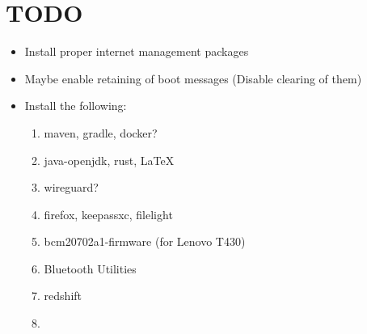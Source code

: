 
\section{TODO}
\begin{itemize}
    \item Install proper internet management packages
    \item Maybe enable retaining of boot messages (Disable clearing of them)
    \item Install the following:
    \begin{enumerate}
        \item maven, gradle, docker?
        \item java-openjdk, rust, \LaTeX
        \item wireguard?
        \item firefox, keepassxc, filelight
        \item bcm20702a1-firmware (for Lenovo T430)
        \item Bluetooth Utilities
        \item redshift
        \item 
    \end{enumerate}
\end{itemize}
